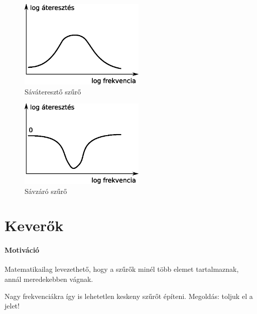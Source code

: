 \documentclass[12pt,a4paper]{article}
\begin{document}
\begin{center}
\begin{minipage}{.5\textwidth}

\begin{figure}[H]
\begin{center}
\includegraphics[width=6cm]{figures/szurok_sav.eps}
\caption{Sáváteresztő szűrő}
\label{fig:savk}
\end{center}
\end{figure}
\end{minipage}%
\begin{minipage}{.5\textwidth}

\begin{figure}[H]
\begin{center}
\includegraphics[width=6cm]{figures/szurok_savz.eps}
\caption{Sávzáró szűrő}
\label{fig:savzk}
\end{center}
\end{figure}
\end{minipage}
\end{center}

\newpage

\section{Keverők}


\paragraph{Motiváció} Matematikailag levezethető, hogy a szűrők minél több elemet tartalmaznak, annál meredekebben vágnak.

Nagy frekvenciákra így is lehetetlen keskeny szűrőt építeni. Megoldás: toljuk el a jelet!
\end{document}
